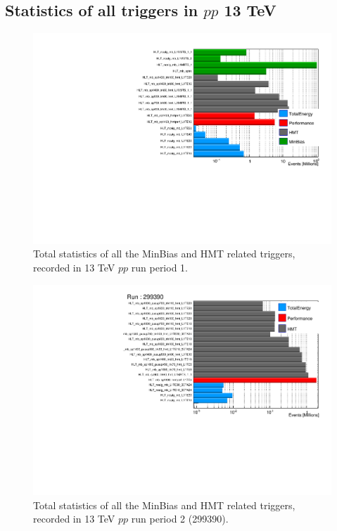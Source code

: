 \subsection{Statistics of all triggers in $pp$ 13 TeV}

\begin{figure}[H]
\centering
\includegraphics[width=.9\linewidth]{figs/sec_evtSlc/stat_pp13_run1.pdf}
\caption{Total statistics of all the MinBias and HMT related triggers, recorded in 13 TeV $pp$ run period 1.}
\label{fig:stat_pp13_run1}
\end{figure}

\begin{figure}[H]
\centering
\includegraphics[width=.9\linewidth]{figs/sec_evtSlc/stat_pp13_run2_1.pdf}
\caption{Total statistics of all the MinBias and HMT related triggers, recorded in 13 TeV $pp$ run period 2 (299390).}
\label{fig:stat_pp13_run2}
\end{figure}


